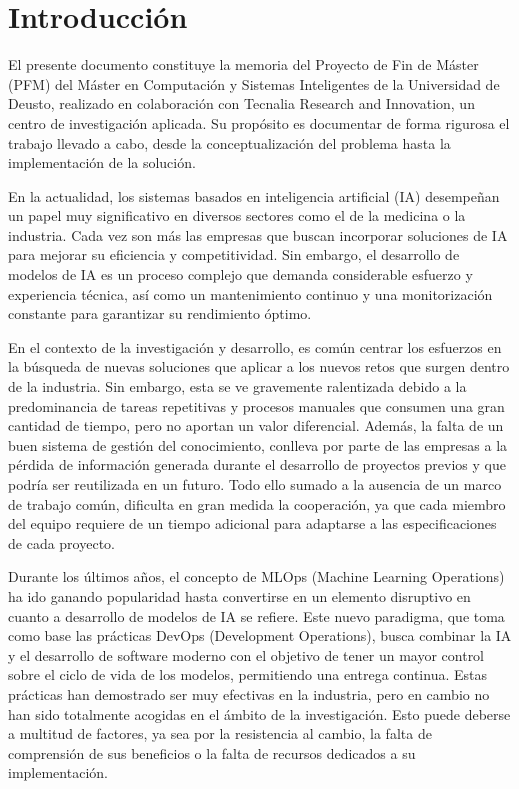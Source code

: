 \section{Introducción}
El presente documento constituye la memoria del Proyecto de Fin de Máster (PFM) del Máster 
en Computación y Sistemas Inteligentes de la Universidad de Deusto, realizado en co\-la\-bo\-ra\-ción con 
Tecnalia Research and Innovation, un centro de investigación aplicada. Su propósito es documentar 
de forma rigurosa el trabajo llevado a cabo, desde la conceptualización del problema hasta la 
implementación de la solución.\medskip

En la actualidad, los sistemas basados en inteligencia artificial (IA) desempeñan un papel 
muy significativo en diversos sectores como el de la medicina o la industria. Cada vez son más las 
empresas que buscan incorporar soluciones de IA para mejorar su eficiencia y competitividad. Sin embargo, 
el desarrollo de modelos de IA es un proceso complejo que demanda con\-si\-de\-ra\-ble esfuerzo y experiencia técnica, 
así como un mantenimiento continuo y una monitorización constante para garantizar su rendimiento óptimo.\medskip

En el contexto de la investigación y desarrollo, es común centrar los esfuerzos en la búsqueda de nuevas
soluciones que aplicar a los nuevos retos que surgen dentro de la industria. Sin embargo, esta se ve gravemente 
ralentizada debido a la predominancia de tareas repetitivas y procesos manuales que consumen una gran
cantidad de tiempo, pero no aportan un valor diferencial. Además, la falta de un buen sistema de gestión
del conocimiento, conlleva por parte de las empresas a la pérdida de información generada durante el desarrollo de
proyectos previos y que podría ser reutilizada en un futuro. Todo ello sumado a la ausencia de un 
marco de trabajo común, dificulta en gran medida la cooperación, ya que cada miembro del equipo requiere 
de un tiempo adicional para adaptarse a las especificaciones de cada proyecto.\medskip

Durante los últimos años, el concepto de MLOps (Machine Learning Operations) ha ido ganando popularidad 
hasta convertirse en un elemento disruptivo en cuanto a desarrollo de modelos de IA se refiere. Este 
nuevo paradigma, que toma como base las prácticas DevOps (Development Operations), busca combinar la IA 
y el desarrollo de software moderno con el objetivo de tener un mayor control sobre el ciclo de 
vida de los modelos, permitiendo una entrega continua. Estas prácticas han demostrado 
ser muy efectivas en la industria, pero en cambio no han sido totalmente acogidas en el ámbito de la 
investigación. Esto puede deberse a multitud de factores, ya sea por la resistencia al cambio, 
la falta de comprensión de sus beneficios o la falta de recursos dedicados a su implementación.\medskip

